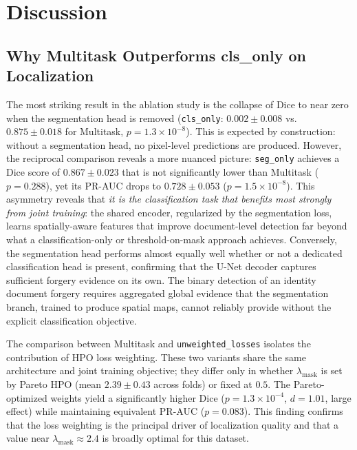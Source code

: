 
\section{Discussion}
\label{sec:discussion}

\subsection{Why Multitask Outperforms cls\_only on Localization}

The most striking result in the ablation study is the collapse of Dice to near
zero when the segmentation head is removed (\texttt{cls\_only}: $0.002 \pm 0.008$
vs.\ $0.875 \pm 0.018$ for Multitask, $p = 1.3 \times 10^{-8}$). This is
expected by construction: without a segmentation head, no pixel-level predictions
are produced. However, the reciprocal comparison reveals a more nuanced
picture: \texttt{seg\_only} achieves a Dice score of $0.867 \pm 0.023$ that is
not significantly lower than Multitask ($p = 0.288$), yet its PR-AUC drops to
$0.728 \pm 0.053$ ($p = 1.5 \times 10^{-8}$). This asymmetry reveals that
\emph{it is the classification task that benefits most strongly from joint
training}: the shared encoder, regularized by the segmentation loss, learns
spatially-aware features that improve document-level detection far beyond what
a classification-only or threshold-on-mask approach achieves. Conversely,
the segmentation head performs almost equally well whether or not a dedicated
classification head is present, confirming that the U-Net decoder captures
sufficient forgery evidence on its own. The binary detection of an
identity document forgery requires aggregated global evidence that the
segmentation branch, trained to produce spatial maps, cannot reliably provide
without the explicit classification objective.

The comparison between Multitask and \texttt{unweighted\_losses} isolates the
contribution of HPO loss weighting. These two variants share the same architecture
and joint training objective; they differ only in whether $\lambda_{\text{mask}}$
is set by Pareto HPO (mean $2.39 \pm 0.43$ across folds) or fixed at $0.5$. The
Pareto-optimized weights yield a significantly higher Dice ($p = 1.3 \times 10^{-4}$,
$d = 1.01$, large effect) while maintaining equivalent PR-AUC ($p = 0.083$).
This finding confirms that the loss weighting is the principal driver of
localization quality and that a value near $\lambda_{\text{mask}} \approx 2.4$
is broadly optimal for this dataset.

